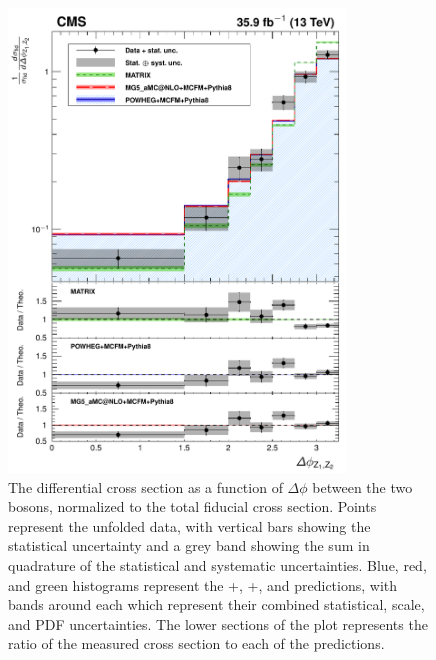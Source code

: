 \begin{figure}[htbp]
  \begin{center}
    \includegraphics[width=0.8\textwidth]{results/unfold_deltaPhiZZ.pdf}
    \caption[Normalized differential {\ZZ} cross section as a function of $\Delta \phi$ between the {\PZ} bosons]{
        The {\ZZ} differential cross section as a function of $\Delta \phi$ between the two {\PZ} bosons, normalized to the total fiducial cross section.
        Points represent the unfolded data, with vertical bars showing the statistical uncertainty and a grey band showing the sum in quadrature of the statistical and systematic uncertainties.
        Blue, red, and green histograms represent the {\POWHEG}+{\MCFM}, {\MGAMC}+{\MCFM}, and {\MATRIX} predictions, with bands around each which represent their combined statistical, scale, and PDF uncertainties.
        The lower sections of the plot represents the ratio of the measured cross section to each of the predictions.
      }\label{fig:unfold_deltaPhiZZ}
  \end{center}
\end{figure}

